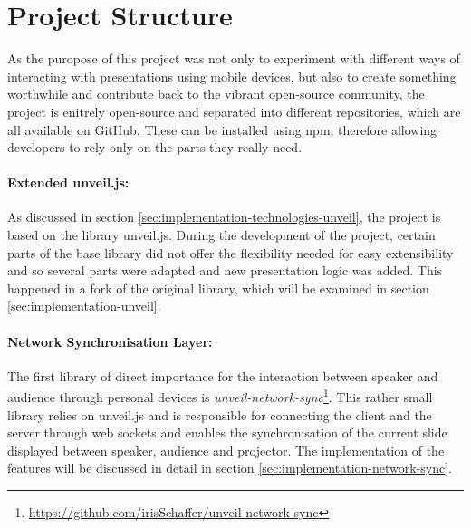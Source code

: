 \section{Project Structure}
\label{sec:implementation-structure}


As the puropose of this project was not only to experiment with different ways of interacting with presentations using mobile devices, but also to create something worthwhile and contribute back to the vibrant open-source community, the project is enitrely open-source and separated into different repositories, which are all available on GitHub. These can be installed using npm, therefore allowing developers to rely only on the parts they really need.

\paragraph{Extended unveil.js:} As discussed in section \ref{sec:implementation-technologies-unveil}, the project is based on the library unveil.js. During the development of the project, certain parts of the base library did not offer the flexibility needed for easy extensibility and so several parts were adapted and new presentation logic was added. This happened in a fork of the original library, which will be examined in section \ref{sec:implementation-unveil}.

\paragraph{Network Synchronisation Layer:} The first library of direct importance for the interaction between speaker and audience through personal devices is \textit{unveil-network-sync}\footnote{\url{https://github.com/irisSchaffer/unveil-network-sync}}. This rather small library relies on unveil.js and is responsible for connecting the client and the server through web sockets and enables the synchronisation of the current slide displayed between speaker, audience and projector. The implementation of the features will be discussed in detail in section \ref{sec:implementation-network-sync}.


